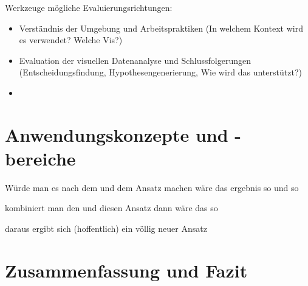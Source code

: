 \documentclass[draft=false
              ,paper=a4
              ,twoside=false
              ,fontsize=11pt
              ,headsepline
              ,BCOR10mm
              ,DIV11
              ]{scrbook}
\newcommand{\TODO}[1]{\colorbox{yellow}{\textcolor{red}{[TODO: #1]}}}
\begin{document}
Werkzeuge mögliche Evaluierungsrichtungen:

\begin{itemize}
  \item Verständnis der Umgebung und Arbeitspraktiken (In welchem Kontext wird es verwendet? Welche Vis?)
  \item Evaluation der visuellen Datenanalyse und Schlussfolgerungen (Entscheidungsfindung, Hypothesengenerierung, Wie wird das unterstützt?)
  \item 
\end{itemize}

\chapter{Anwendungskonzepte und -bereiche} %
\label{cha:anwendungskonzepte_und_bereiche}

Würde man es nach dem und dem Ansatz machen wäre das ergebnis so und so

kombiniert man den und diesen Ansatz dann wäre das so

daraus ergibt sich (hoffentlich) ein völlig neuer Ansatz

\chapter{Zusammenfassung und Fazit} %
\label{cha:zusammenfassung_und_fazit}


\backmatter



\clearpage

\renewcommand{\nomname}{Glossar}
\markboth{\nomname}{\nomname} %
\printnomenclature
\clearpage

\printindex

\HAWasurency
\end{document}
